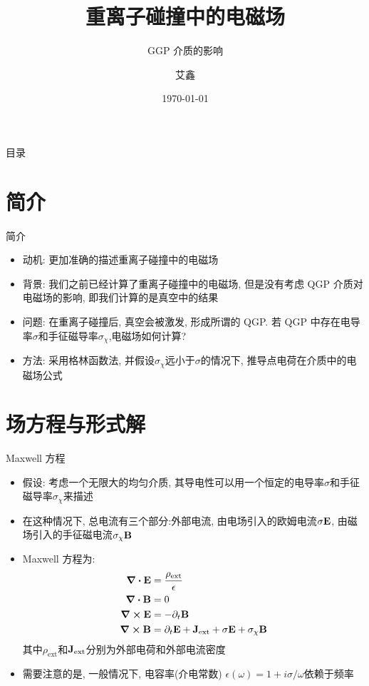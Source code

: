 \documentclass{beamer}
\title{重离子碰撞中的电磁场}
\subtitle{GGP 介质的影响}
\institute{三峡大学理学院}
\author{艾鑫}
\date{\today}
\begin{document}
\maketitle

\begin{frame}{目录}
  \tableofcontents
\end{frame}

\section{简介}
\begin{frame}{简介}
  \begin{itemize}
  \item 动机: 更加准确的描述重离子碰撞中的电磁场
  \item 背景: 我们之前已经计算了重离子碰撞中的电磁场, 但是没有考虑 QGP 介质对电磁场的影响, 即我们计算的是真空中的结果
  \item 问题: 在重离子碰撞后, 真空会被激发, 形成所谓的 QGP. 若 QGP 中存在电导率$\sigma$和手征磁导率$\sigma_{\chi}$,电磁场如何计算?
  \item 方法: 采用格林函数法, 并假设$\sigma_\chi$远小于$\sigma$的情况下, 推导点电荷在介质中的电磁场公式
  \end{itemize}
\end{frame}

\section{场方程与形式解}
\begin{frame}{Maxwell 方程}
  \begin{itemize}
  \item 假设: 考虑一个无限大的均匀介质, 其导电性可以用一个恒定的电导率$\sigma$和手征磁导率$\sigma_{\chi}$来描述
  \item 在这种情况下, 总电流有三个部分:外部电流, 由电场引入的欧姆电流$\sigma\vb{E}$, 由磁场引入的手征磁电流$\sigma_{\chi} \vb{B}$
  \item Maxwell 方程为:
    \begin{align}
      \div \vb{E} &= \frac{\rho_{\text{ext}}}{\epsilon} \label{eq:max1} \\
      \div \vb{B} &= 0 \label{eq:max2} \\
      \curl \vb{E} &= - \partial_t \vb{B} \label{eq:max3} \\
      \curl \vb{B} &= \partial_t \vb{E} + \vb{J}_{\text{ext}} + \sigma \vb{E} + \sigma_{\chi} \vb{B} \label{eq:max4}
    \end{align}
    其中$\rho_{\text{ext}}$和$\vb{J}_{\text{ext}}$分别为外部电荷和外部电流密度
  \item 需要注意的是, 一般情况下, 电容率(介电常数) $\epsilon (\omega) = 1 + i \sigma / \omega$依赖于频率
  \end{itemize}
\end{frame}
\end{document}
